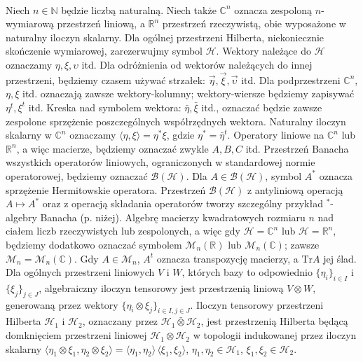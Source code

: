 \paragraph{}
Niech $n \in \mathbb{N}$ będzie liczbą naturalną.
Niech także $\mathbb{C}^{n}$ oznacza zespoloną $n$-wymiarową przestrzeń liniową,
a $\mathbb{R}^{n}$ przestrzeń rzeczywistą,
obie wyposażone w naturalny iloczyn skalarny.
Dla ogólnej przestrzeni Hilberta,
niekoniecznie skończenie wymiarowej,
zarezerwujmy symbol $\mathcal{H}$.
Wektory należące do $\mathcal{H}$ oznaczamy
$\eta, \xi, \upsilon$ itd.
Dla odróżnienia od wektorów należących do innej przestrzeni,
będziemy czasem używać strzałek: $\vec{\eta}, \vec{\xi}, \vec{\upsilon}$ itd.
Dla podprzestrzeni $\mathbb{C}^{n}$,
$\eta, \xi$ itd. oznaczają zawsze wektory-kolumny;
wektory-wiersze będziemy zapisywać
$\eta^{t}, \xi^{t}$ itd.
Kreska nad symbolem wektora: $\bar{\eta}, \bar{\xi}$ itd.,
oznaczać będzie zawsze zespolone sprzężenie poszczególnych współrzędnych wektora.
Naturalny iloczyn skalarny w $\mathbb{C}^{n}$ oznaczamy
$\langle \eta , \xi \rangle = \eta^{*} \xi$,
gdzie $\eta^{*} = \bar{\eta}^{t}$.
Operatory liniowe na $\mathbb{C}^{n}$ lub $\mathbb{R}^{n}$,
a więc macierze,
będziemy oznaczać zwykle $A, B, C$ itd.
Przestrzeń Banacha wszystkich operatorów liniowych,
ograniczonych w standardowej normie operatorowej,
będziemy oznaczać $\mathcal{B}(\mathcal{H})$.
Dla $A \in \mathcal{B}(\mathcal{H})$,
symbol $A^{*}$ oznacza sprzężenie Hermitowskie operatora.
Przestrzeń $\mathcal{B}(\mathcal{H})$ z antyliniową operacją
$A \mapsto A^{*}$ oraz z operacją składania operatorów
tworzy szczególny przykład \mbox{$^{*}$-algebry} Banacha (p. niżej).
Algebrę macierzy kwadratowych rozmiaru $n$ nad ciałem liczb
rzeczywistych lub zespolonych,
a więc gdy $\mathcal{H} = \mathbb{C}^{n}$ lub
$\mathcal{H} = \mathbb{R}^{n}$,
będziemy dodatkowo oznaczać symbolem $\mathcal{M}_{n}(\mathbb{R})$ lub
$\mathcal{M}_{n}(\mathbb{C})$;
zawsze $\mathcal{M}_{n} = \mathcal{M}_{n}(\mathbb{C})$.
Gdy $A \in \mathcal{M}_{n}$,
$A^{t}$ oznacza transpozycję macierzy,
a $\text{Tr} A$ jej ślad.
Dla ogólnych przestrzeni liniowych $V$ i $W$,
których bazy to odpowiednio
$\{ \eta_{i} \}_{i \in I}$ i
$\{ \xi_{j} \}_{j \in J}$,
algebraiczny iloczyn tensorowy
jest przestrzenią liniową $V \! \otimes \! W$, generowaną przez wektory
$\{\eta_{i} \otimes \xi_{j}\}_{i\in I, j \in J}$.
Iloczyn tensorowy przestrzeni Hilberta $\mathcal{H}_{1}$ i $\mathcal{H}_{2}$,
oznaczany przez $\mathcal{H}_{1} \bar{\otimes} \mathcal{H}_{2}$,
jest przestrzenią Hilberta będącą domknięciem przestrzeni liniowej
$\mathcal{H}_{1} \! \otimes \! \mathcal{H}_{2}$ w topologii indukowanej
przez iloczyn skalarny
$\langle \eta_{1} \otimes \xi_{1}, \eta_{2} \otimes \xi_{2} \rangle =
\langle \eta_{1} , \eta_{2} \rangle \, \langle \xi_{1}, \xi_{2} \rangle$,
$\eta_{1}, \eta_{2} \in \mathcal{H}_{1}$,
$\xi_{1}, \xi_{2} \in \mathcal{H}_{2}$.


